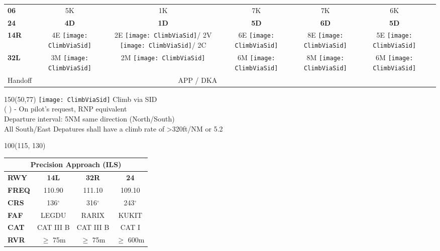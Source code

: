 \documentclass[10pt,landscape,a4paper]{article}
\newcommand{\x}{\texttt{[image: ClimbViaSid]}}
\begin{document}
\begin{textblock}{40}
\begin{table}[h]
\begin{tabular}{|l|c|c|c||c|c|c|c}
\textbf{06} & & 5K & 1K & 7K & 7K & 6K & \\ \cline{1-7}
\textbf{24} & & \textbf{4D} & \textbf{1D} & \textbf{5D} & \textbf{6D} & \textbf{5D} & \\ \cline{1-7}
\textbf{14R} & & 4E \x & 2E \x / 2V \x / 2C & 6E \x & 8E \x & 5E \x & \\ \cline{1-7}
\textbf{32L} & & 3M \x & 2M \x & 6M \x & 8M \x & 6M \x & \\ \hline
\multicolumn{2}{|l}{Handoff} & \multicolumn{4}{c}{\textunderscore{}APP / DKA} & & \\ \cline{1-7}
\end{tabular}
\end{table}
\end{textblock}

\begin{textblock}{150}(50,77)
\noindent \texttt{[image: ClimbViaSid]} \color{red}Climb via SID \\
\color{black}( ) - On pilot's request, RNP equivalent \\
Departure interval: 5NM same direction (North/South) \\
All South/East Depatures shall have a climb rate of \textgreater{}320ft/NM or 5.2%
\end{textblock}


\begin{textblock}{100}(115, 130)
    \begin{table}
        \begin{tabular}{|l|c|c|c|}
	        \multicolumn{4}{c}{\textbf{Precision Approach (ILS)}} \\
            \hline
            \textbf{RWY} & \textbf{14L} & \textbf{32R} & \textbf{24} \\ 
            \hline
            \textbf{FREQ} & 110.90 & 111.10 & 109.10 \\ 
            \textbf{CRS} & 136$^\circ$ & 316$^\circ$ & 243$^\circ$ \\ 
            \textbf{FAF} & LEGDU & RARIX & KUKIT \\ 
            \textbf{CAT} & CAT III B & CAT III B & CAT I \\ 
            \textbf{RVR} & $\geq$ 75m & $\geq$ 75m & $\geq$ 600m \\ 
            \hline
        \end{tabular}
    \end{table}
\end{textblock}
\end{document}
